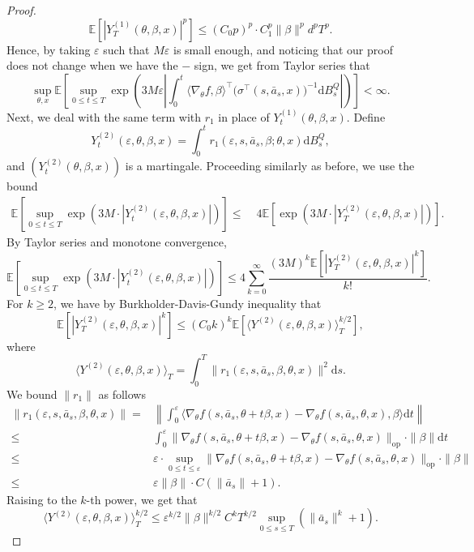 \documentclass{article}
\newcommand{\eps}{\epsilon}
\newcommand{\1}{\mathbbm{1}}
\newcommand{\op}{\mathrm{op}}
\newcommand{\E}{\mathbb E}
\renewcommand{\H}{\mathcal{H}}
\numberwithin{equation}{section}
\def\eps{\varepsilon}
\def\E{{\bf E}} \def\H{{\bf H}} \def\J{{\bf J}}
\def\d{{\mathrm{d}}}
\def\E{\mathbb{E}}
\begin{document}
\begin{proof}
$$\E\left[|Y_{T}^{(1)}(\theta,\beta, x)|^{p}\right]\leq(C_{0}p)^{p}\cdot C_{1}^{p}\|\beta\|^{p}d^{p}T^{p}.$$
Hence, by taking $\eps$ such that $M\eps$ is small enough, and noticing that our proof does not change when we have the $-$ sign, we get from Taylor series that
$$\sup_{\theta, x}\E\left[\sup_{0\leq t\leq T}\exp\left(3M\eps\left|\int_{0}^{t}\langle \nabla_{\theta}f, \beta\rangle^{\top}\big(\sigma^\top(s, \bar a_{s}, x)\big)^{-1}\d B_{s}^{Q}\right|\right)\right]<\infty.$$
Next, we deal with the same term with $r_{1}$ in place of $Y_{t}^{(1)}(\theta,\beta, x)$. Define
$$Y_{t}^{(2)}(\eps, \theta,\beta, x)=\int_{0}^{t}r_{1}(\eps, s, \bar a_{s}, \beta; \theta, x)\d B_{s}^{Q},$$
and $(Y_{t}^{(2)}(\theta, \beta, x))$ is a martingale. Proceeding similarly as before, we use the bound
\begin{align*}
\E\left[\sup_{0\leq t\leq T}\exp\left(3M\cdot |Y_{t}^{(2)}(\eps, \theta, \beta, x)|\right)\right]\leq\;&4\E\left[\exp\left(3M\cdot |Y_{T}^{(2)}(\eps, \theta, \beta, x)|\right)\right].
\end{align*}
By Taylor series and monotone convergence,
$$\E\left[\sup_{0\leq t\leq T}\exp\left(3M\cdot |Y_{t}^{(2)}(\eps, \theta, \beta, x)|\right)\right]\leq4\sum_{k=0}^{\infty}\dfrac{(3M)^{k}\E[|Y_{T}^{(2)}(\eps, \theta, \beta, x)|^{k}]}{k!}.$$
For $k\geq 2$, we have by Burkholder-Davis-Gundy inequality that
$$\E[|Y_{T}^{(2)}(\eps, \theta, \beta, x)|^{k}]\leq (C_{0}k)^{k}\E[\langle Y^{(2)}(\eps, \theta, \beta, x)\rangle_{T}^{k/2}],$$
where
$$\langle Y^{(2)}(\eps, \theta, \beta, x)\rangle_{T}=\int_{0}^{T}\|r_{1}(\eps, s, \bar a_{s}, \beta, \theta, x)\|^{2}\d s.$$
We bound $\|r_{1}\|$ as follows
\begin{align*}
\|r_{1}(\eps, s, \bar a_{s},\beta, \theta, x)\|=&\left\|\int_{0}^{\eps}\langle\nabla_{\theta} f(s, \bar a_{s}, \theta+t\beta, x)-\nabla_{\theta}f(s, \bar a_{s}, \theta, x), \beta\rangle \d t\right\|\\
\leq&\int_{0}^{\eps}\|\nabla_{\theta} f(s, \bar a_{s}, \theta+t\beta, x)-\nabla_{\theta} f(s, \bar a_{s},\theta, x)\|_{\op}\cdot \|\beta\|\d t\\
\leq&\eps\cdot \sup_{0\leq t\leq \eps}\|\nabla_{\theta} f(s, \bar a_{s}, \theta+t\beta, x)-\nabla_{\theta} f(s, \bar a_{s},\theta, x)\|_{\op}\cdot \|\beta\|\\
\leq&\eps\|\beta\|\cdot C(\|\bar a_{s}\|+1).
\end{align*} 
Raising to the $k$-th power, we get that
$$\langle Y^{(2)}(\eps, \theta, \beta, x)\rangle_{T}^{k/2}\leq \eps^{k/2}\|\beta\|^{k/2}C^{k}T^{k/2}\sup_{0\leq s\leq T}(\|\bar a_{s}\|^{k}+1).$$

\end{proof}
\end{document}
